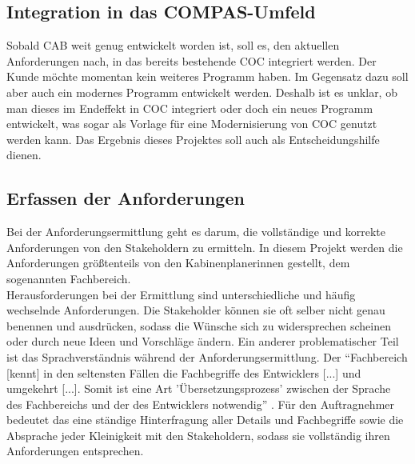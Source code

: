 \documentclass [12pt, a4paper, oneside, titlepage, ngerman]{article}
\begin{document}
\subsection{Integration in das COMPAS-Umfeld}
Sobald \ac{CAB} weit genug entwickelt worden ist, soll es, den aktuellen Anforderungen nach, in das bereits bestehende \ac{COC} integriert werden. Der Kunde möchte momentan kein weiteres Programm haben. %
Im Gegensatz dazu soll aber auch ein modernes Programm entwickelt werden. Deshalb ist es unklar, ob man dieses im Endeffekt in \ac{COC} integriert oder doch ein neues Programm entwickelt, was sogar als Vorlage für eine Modernisierung von \ac{COC} genutzt werden kann. Das Ergebnis dieses Projektes soll auch als Entscheidungshilfe dienen.\\



\subsection{Erfassen der Anforderungen} \label{anforderungen}
Bei der Anforderungsermittlung geht es darum, die vollständige und korrekte Anforderungen von den Stakeholdern zu ermitteln. In diesem Projekt werden die Anforderungen größtenteils von den Kabinenplanerinnen gestellt, dem sogenannten Fachbereich. \\

\noindent Herausforderungen bei der Ermittlung sind unterschiedliche und häufig wechselnde Anforderungen. Die Stakeholder können sie oft selber nicht genau benennen und ausdrücken, sodass die Wünsche sich zu widersprechen scheinen oder durch neue Ideen und Vorschläge ändern. %
Ein anderer problematischer Teil ist das Sprachverständnis während der Anforderungsermittlung. Der "`Fachbereich [kennt] in den seltensten Fällen die Fachbegriffe des Entwicklers [...] und umgekehrt [...]. Somit ist eine Art 'Übersetzungsprozess' zwischen der Sprache des Fachbereichs und der des Entwicklers notwendig"' \cite[S.319]{Alpar2016} . 
Für den Auftragnehmer bedeutet das eine ständige Hinterfragung aller Details und Fachbegriffe sowie die Absprache jeder Kleinigkeit mit den Stakeholdern, sodass sie vollständig ihren Anforderungen entsprechen. \\
\end{document}
